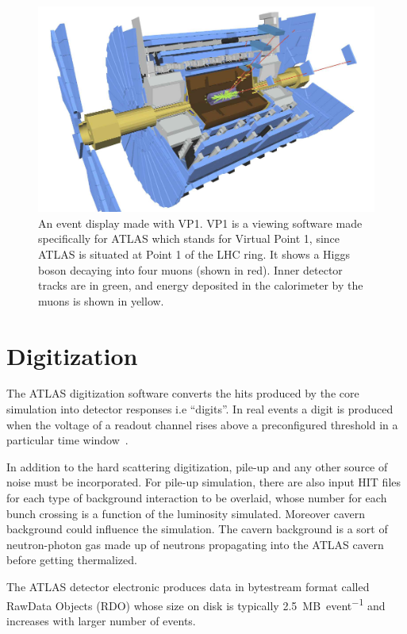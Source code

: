 \begin{figure}[tp]
\centering
\includegraphics[width=.75\textwidth]{MCSample/simulation}
\caption{An event display made with VP1. VP1 is a viewing software made specifically for ATLAS which stands for Virtual Point 1, since ATLAS is situated at Point 1 of the LHC ring. It shows a Higgs boson decaying into four muons (shown in red). Inner detector tracks are in green, and energy deposited in the calorimeter by the muons is shown in yellow.}
\label{fig:simulation}
\end{figure}

\section{Digitization}
The ATLAS digitization software converts the hits produced by the core simulation into detector responses i.e ``digits''. In real events a digit is produced when the voltage of a readout channel rises above a preconfigured threshold in a particular time window~\cite{simulation}.


In addition to the hard scattering digitization, pile-up and any other source of noise must be incorporated. For pile-up simulation, there are also input HIT files for each type of background interaction to be overlaid, whose number for each bunch crossing is a function of the luminosity simulated. Moreover cavern background could influence the simulation. The cavern background is a sort of neutron-photon gas made up of neutrons propagating into the ATLAS cavern before getting thermalized. 

The ATLAS detector electronic produces data in bytestream format called RawData Objects (RDO) whose size on disk is typically \SI{2.5}{MB\per event} and increases with larger number of \pileup events.

